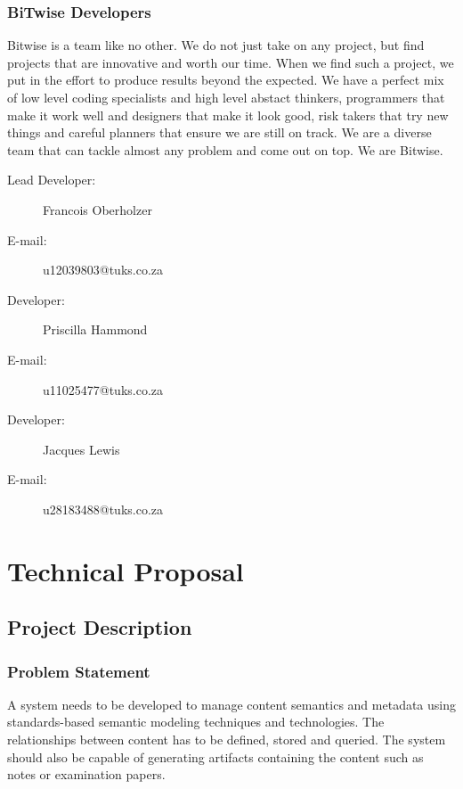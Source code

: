 \documentclass[a4paper]{article}
\begin{document}
			\subsubsection{BiTwise Developers}

Bitwise is a team like no other. We do not just take on any project, but find projects that are innovative and worth our time. When we find such a project, we put in the effort to produce results beyond the expected. We have a perfect mix of low level coding specialists and high level abstact thinkers, programmers that make it work well and designers that make it look good, risk takers that try new things and careful planners that ensure we are still on track. We are a diverse team that can tackle almost any problem and come out on top. We are Bitwise.

				\begin{description}
					\item[Lead Developer:] Francois Oberholzer
					\item[E-mail:] u12039803@tuks.co.za
				\end{description}

				\begin{description}
					\item[Developer:] Priscilla Hammond
					\item[E-mail:] u11025477@tuks.co.za
				\end{description}

				\begin{description}
					\item[Developer:] Jacques Lewis
					\item[E-mail:] u28183488@tuks.co.za
				\end{description}


	\section{Technical Proposal}

		\subsection{Project Description}

			\subsubsection{Problem Statement}

A system needs to be developed to manage content semantics and metadata using standards-based semantic modeling techniques and technologies. The relationships between content has to be defined, stored and queried. The system should also be capable of generating artifacts containing the content such as notes or examination papers.
\end{document}
